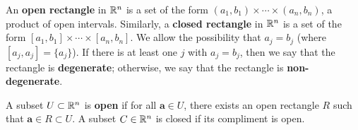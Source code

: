 \documentclass[../main.tex]{subfiles}
\begin{document}
\begin{definition}\label{dfn:18.13}
    An \textbf{open rectangle} in $\mathbb{R}^n$ is a set of the form $(a_1,b_1)\times\cdots\times(a_n,b_n)$, a product of open intervals. Similarly, a \textbf{closed rectangle} in $\mathbb{R}^n$ is a set of the form $[a_1,b_1]\times\cdots\times[a_n,b_n]$. We allow the possibility that $a_j=b_j$ (where $[a_j,a_j]=\{a_j\}$). If there is at least one $j$ with $a_j=b_j$, then we say that the rectangle is \textbf{degenerate}; otherwise, we say that the rectangle is \textbf{non-degenerate}.
\end{definition}

\begin{definition}\label{dfn:18.14}
    A subset $U\subset\mathbb{R}^n$ is \textbf{open} if for all $\mathbf{a}\in U$, there exists an open rectangle $R$ such that $\mathbf{a}\in R\subset U$. A subset $C\in\mathbb{R}^n$ is closed if its compliment is open.
\end{definition}
\end{document}
